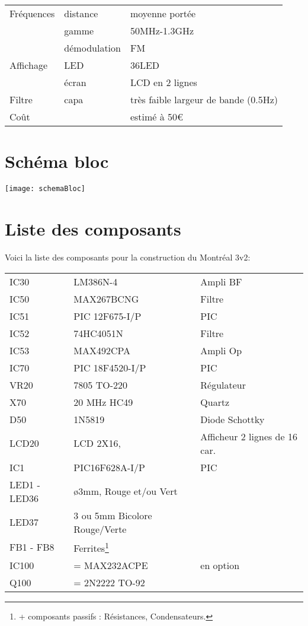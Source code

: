 \begin{tabular}{ l l l}
Fréquences & distance & moyenne portée\\
 & gamme & 50MHz-1.3GHz\\
 & démodulation & FM\\
Affichage & LED & 36LED\\
& écran & LCD en 2 lignes\\
Filtre & capa & très faible largeur de bande (0.5Hz)\\
Coût & & estimé à 50\euro \\
\end{tabular}



\section{Schéma bloc}

\texttt{[image: schemaBloc]}

\section{Liste des composants}
Voici la liste des composants pour la construction du Montréal 3v2:

\begin{tabular}{ l l l}

IC30&          LM386N-4&                  Ampli BF\\
IC50&          MAX267BCNG&          Filtre\\
IC51& PIC  12F675-I/P& PIC \\
IC52&          74HC4051N&               Filtre\\
IC53&          MAX492CPA &            Ampli Op\\
IC70& PIC  18F4520-I/P& PIC\\
VR20 &       7805 TO-220  &            Régulateur\\
X70&           20 MHz  HC49&           Quartz\\
D50&           1N5819       &                Diode Schottky\\
LCD20&      LCD 2X16,&                 Afficheur 2 lignes de 16 car.\\
IC1& PIC16F628A-I/P& PIC\\
LED1 - LED36& ø3mm, Rouge et/ou Vert&\\
LED37&                        3 ou 5mm Bicolore Rouge/Verte &\\
FB1 - FB8&                   Ferrites\footnote{+ composants passifs : Résistances, Condensateurs.}&\\
IC100&        = MAX232ACPE&        en option\\
Q100 &        = 2N2222 TO-92&\\
\end{tabular}



